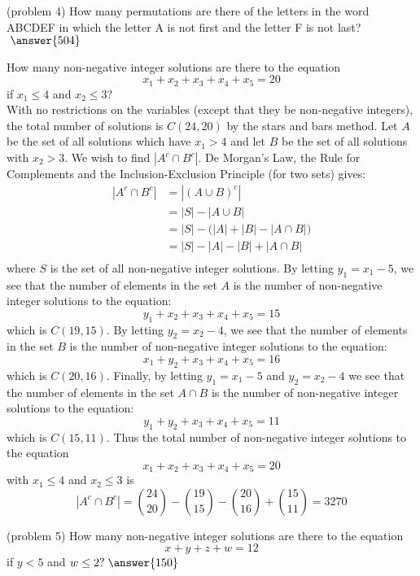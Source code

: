 \documentclass[handout]{ximera}
\begin{document}
\begin{problem}(problem 4)
How many permutations are there of the letters in the word ABCDEF in which the letter A is not 
first and the letter F is not last? $\; \answer{504}$
\end{problem}



\begin{example}[example 5]
How many non-negative integer solutions are there to the equation
\[
x_1 + x_2 + x_3 + x_4 + x_5 = 20
\]
if $x_1 \leq 4$ and $x_2 \leq 3$?\\
With no restrictions on the variables (except that they be non-negative integers), 
the total number of solutions is $C(24, 20)$ by the stars and bars method.
Let $A$ be the set of all solutions which have $x_1 > 4$ and let $B$ be the set of all solutions with $x_2 > 3$.
We wish to find $|A^c \cap B^c|$.
De Morgan's Law, the Rule for Complements and the Inclusion-Exclusion Principle (for two sets) gives:
\begin{align*}
|A^c \cap B^c| &= |(A \cup B)^c|\\
               &= |S| - |A\cup B|\\
               &= |S| - \Big(|A| + |B| - |A\cap B|\Big)\\
               &= |S| - |A| - |B| + |A\cap B|\\
\end{align*}
where $S$ is the set of all non-negative integer solutions. By letting $y_1 = x_1 -5$, we see that 
the number of elements in the set $A$
is the number of non-negative integer solutions to the equation:
\[
y_1 + x_2 + x_3 + x_4 + x_5 = 15
\]
which is $C(19, 15)$. By letting $y_2 = x_2 -4$, we see that the number of elements in the set $B$
is the number of non-negative integer solutions to the equation:
\[
x_1 + y_2 + x_3 + x_4 + x_5 = 16
\]
which is $C(20, 16)$. Finally, by letting $y_1 = x_1 -5$ and $y_2 = x_2 -4$ we see that the number of 
elements in the set $A \cap B$
is the number of non-negative integer solutions to the equation:
\[
y_1 + y_2 + x_3 + x_4 + x_5 = 11
\]
which is $C(15, 11)$. 
Thus the total number of non-negative integer solutions to the equation
\[
x_1 + x_2 + x_3 + x_4 + x_5 = 20
\]
with $x_1 \leq 4$ and $x_2 \leq 3$ is
\[
|A^c \cap B^c| = \binom{24}{20} - \binom{19}{15} - \binom{20}{16} + \binom{15}{11} = 3270
\]

\end{example}


\begin{problem}(problem 5)
How many non-negative integer solutions are there to the equation
\[
x + y + z + w = 12
\]
if $y < 5$ and $w \leq 2 ? \; \answer{150}$

\end{problem}
\end{document}
